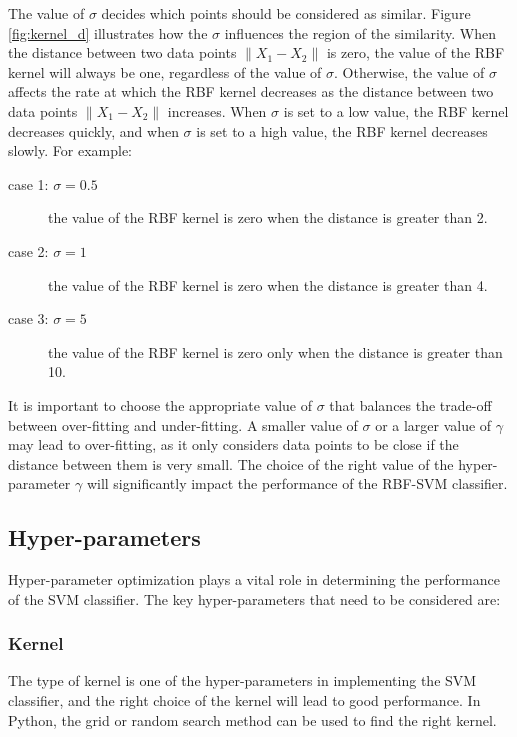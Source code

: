 The value of $\sigma$ decides which points should be considered as similar. Figure \ref{fig:kernel_d} illustrates how the $\sigma$ influences the region of the similarity. When the distance between two data points $\|X_1-X_2\|$ is zero, the value of the RBF kernel will always be one, regardless of the value of $\sigma$. Otherwise, the value of $\sigma$ affects the rate at which the RBF kernel decreases as the distance between two data points $\|X_1-X_2\|$  increases. When $\sigma$ is set to a low value, the RBF kernel decreases quickly, and when $\sigma$ is set to a high value, the RBF kernel decreases slowly. For example:

\begin{description}
  \item[case 1: $\sigma=0.5$] the value of the RBF kernel is zero when the distance is greater than 2.
  \item[case 2: $\sigma=1$] the value of the RBF kernel is zero when the distance is greater than 4.
  \item[case 3: $\sigma=5$] the value of the RBF kernel is zero only when the distance is greater than 10.
\end{description}


It is important to choose the appropriate value of $\sigma$ that balances the trade-off between over-fitting and under-fitting. A smaller value of $\sigma$ or a larger value of $\gamma$ may lead to over-fitting, as it only considers data points to be close if the distance between them is very small. The choice of the right value of the hyper-parameter $\gamma$ will significantly impact the performance of the RBF-SVM classifier.

\subsection{Hyper-parameters}

Hyper-parameter optimization plays a vital role in determining the performance of the SVM classifier. The key hyper-parameters that need to be considered are:

\subsubsection{\textbf{Kernel}}
The type of kernel is one of the hyper-parameters in implementing the SVM classifier, and the right choice of the kernel will lead to good performance. In Python, the grid or random search method can be used to find the right kernel.


